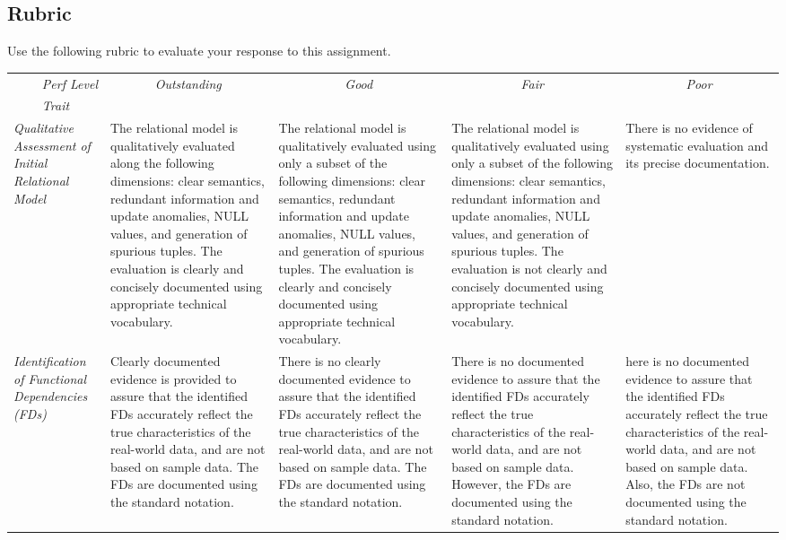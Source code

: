 \documentclass[11pt]{article}
\begin{document}
\begin{landscape}

\section{Rubric} \label{sec:Rubric}

Use the following rubric to evaluate your response to this assignment.

\vspace*{0.15in}

\begin{tabular}{p{1.2in}p{1.5in}p{1.5in}p{1.5in}p{1.5in}} \toprule
\multicolumn{1}{r}{\emph{Perf Level}} & \multicolumn{1}{c}{\emph{Outstanding}} & \multicolumn{1}{c}{\emph{Good}} & \multicolumn{1}{c}{\emph{Fair}} & \multicolumn{1}{c}{\emph{Poor}} \\ 
\multicolumn{1}{c}{\emph{Trait}} & & & & \\ \midrule


\emph{Qualitative Assessment of Initial Relational Model} &
The relational model is qualitatively evaluated along the following dimensions: clear semantics, redundant information and update anomalies, NULL values, and generation of spurious tuples. The evaluation is clearly and concisely documented using appropriate technical vocabulary. &
The relational model is qualitatively evaluated using only a subset of the following dimensions: clear semantics, redundant information and update anomalies, NULL values, and generation of spurious tuples. The evaluation is clearly and concisely documented using appropriate technical vocabulary. &
The relational model is qualitatively evaluated using only a subset of the following dimensions: clear semantics, redundant information and update anomalies, NULL values, and generation of spurious tuples. The evaluation is not clearly and concisely documented using appropriate technical vocabulary. &
There is no evidence of systematic evaluation and its precise documentation. \\ \midrule

\emph{Identification of Functional Dependencies (FDs)} &
Clearly documented evidence is provided to assure that the identified FDs accurately reflect the true characteristics of the real-world data, and are not based on sample data. The FDs are documented using the standard notation. &
There is no clearly documented evidence to assure that the identified FDs accurately reflect the true characteristics of the real-world data, and are not based on sample data. The FDs are documented using the standard notation. &
There is no documented evidence to assure that the identified FDs accurately reflect the true characteristics of the real-world data, and are not based on sample data. However, the FDs are documented using the standard notation. &
here is no documented evidence to assure that the identified FDs accurately reflect the true characteristics of the real-world data, and are not based on sample data. Also, the FDs are not documented using the standard notation. \\ \bottomrule


\end{tabular}
\end{landscape}
\end{document}

